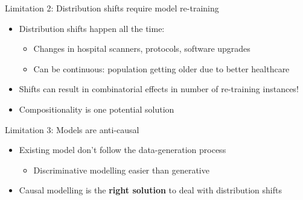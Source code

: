 \begin{frame}{Limitation 2: Distribution shifts require model re-training}


\begin{itemize}
 \item Distribution shifts happen all the time:
 \begin{itemize}
 \item Changes in hospital scanners, protocols, software upgrades
 \item Can be continuous: population getting older due to better healthcare
\end{itemize}

\vt
 \item Shifts can result in combinatorial effects in number of re-training instances!

\vt
 
 \item Compositionality is one potential solution
 
\end{itemize}

\begin{center}
\end{center}
 
\end{frame}


\begin{frame}{Limitation 3: Models are anti-causal}


\begin{itemize}
 \item Existing model don't follow the data-generation process
\begin{itemize}
   \item Discriminative modelling easier than generative
\end{itemize}

 \vo
 
  
 \vo 
 
 \item Causal modelling is the \textbf{right solution} to deal with distribution shifts
 
 \vo
 
\end{itemize}


\begin{center}
\end{center}
 
\end{frame}


